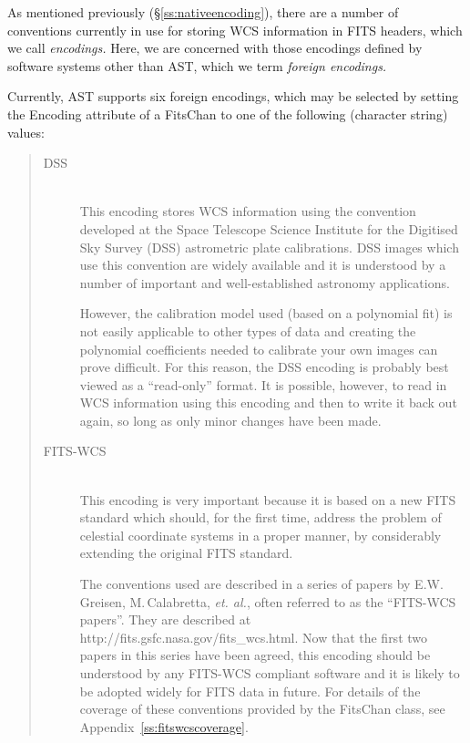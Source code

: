 \documentclass[twoside,11pt]{article}
\newcommand{\htmladdnormallink}[2]{#1}
\newcommand{\appref}[1]{Appendix~\ref{#1}}
\newcommand{\secref}[1]{\S\ref{#1}}
\newcommand{\appref}[1]{\ref{#1}}
\newcommand{\secref}[1]{\ref{#1}}
\begin{document}
As mentioned previously (\secref{ss:nativeencoding}), there are a
number of conventions currently in use for storing WCS information in
FITS headers, which we call {\em{encodings.}} Here, we are concerned
with those encodings defined by software systems other than AST, which
we term {\em{foreign encodings.}}

Currently, AST supports six foreign encodings, which may be selected
by setting the Encoding attribute of a FitsChan to one of the
following (character string) values:

\begin{quote}
\begin{description}
\item[DSS]\mbox{}\\
This encoding stores WCS information using the convention developed at
the Space Telescope Science Institute for the Digitised Sky Survey
(DSS) astrometric plate calibrations.  DSS images which use this
convention are widely available and it is understood by a number of
important and well-established astronomy applications.

However, the calibration model used (based on a polynomial fit) is not
easily applicable to other types of data and creating the polynomial
coefficients needed to calibrate your own images can prove
difficult. For this reason, the DSS encoding is probably best viewed
as a ``read-only'' format. It is possible, however, to read in WCS
information using this encoding and then to write it back out again,
so long as only minor changes have been made.

\item[FITS-WCS]\mbox{}\\
This encoding is very important because it is based on a new FITS standard
which should, for the first time, address the problem of celestial coordinate
systems in a proper manner, by considerably extending the original FITS
standard.

The conventions used are described in a series of papers by
E.W.\,Greisen, M.\,Calabretta, \emph{et. al.}, often referred to as the
``FITS-WCS papers''. They are described at
\htmladdnormallink{http://fits.gsfc.nasa.gov/fits\_wcs.html}
{http://fits.gsfc.nasa.gov/fits_wcs.html}. Now that the first two papers
in this series have been agreed, this encoding should be understood by any
FITS-WCS compliant software and it is likely to be adopted widely for FITS
data in future.  For details of the coverage of these conventions provided
by the FitsChan class, see \appref{ss:fitswcscoverage}.


\end{description}
\end{quote}
\end{document}
